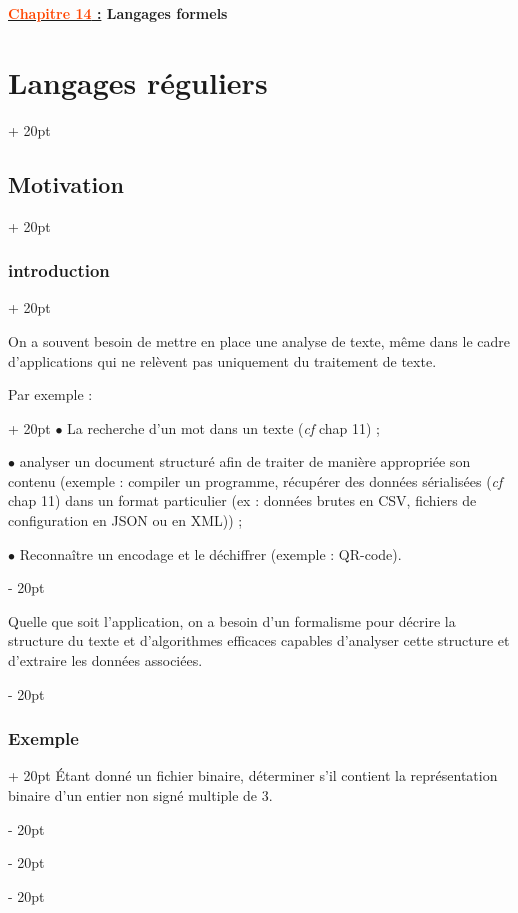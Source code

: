 \documentclass[a4paper, 12pt, twoside]{article}
\newcommand{\Emph}{\textcolor{ff4500}}
\newcommand{\ind}[1][20pt]{\advance\leftskip + #1}
\newcommand{\deind}[1][20pt]{\advance\leftskip - #1}
\newenvironment{indt}[2][20pt]{#2 \par \ind[#1]}{\par \deind} %
\newcommand{\thetitle}[2]{\begin{center}\textbf{{\LARGE \underline{\Emph{#1} :}} {\Large #2}}\end{center}}
\begin{document}
    
    \thetitle{Chapitre 14}{Langages formels}
    
    \tableofcontents
    \newpage
    
    \begin{indt}{\section{Langages réguliers}}
        \begin{indt}{\subsection{Motivation}}
            \begin{indt}{\subsubsection{introduction}}
                \label{1.1.1}

                On a souvent besoin de mettre en place une analyse de texte, même dans le cadre d'applications qui ne relèvent pas uniquement du traitement de texte.

                \begin{indt}{Par exemple :}
                    $\bullet$ La recherche d'un mot dans un texte (\textit{cf} chap 11) ;

                    $\bullet$ analyser un document structuré afin de traiter de manière appropriée son contenu (exemple : compiler un programme, récupérer des données sérialisées (\textit{cf} chap 11) dans un format particulier (ex : données brutes en CSV, fichiers de configuration en JSON ou en XML)) ;

                    $\bullet$ Reconnaître un encodage et le déchiffrer (exemple : QR-code).
                \end{indt}

                \vspace{12pt}
                
                Quelle que soit l'application, on a besoin d'un formalisme pour décrire la structure du texte et d'algorithmes efficaces capables d'analyser cette structure et d'extraire les données associées.
            \end{indt}

            \vspace{12pt}
            
            \begin{indt}{\subsubsection{Exemple}}
                \'Etant donné un fichier binaire, déterminer s'il contient la représentation binaire d'un entier non signé multiple de 3.


\end{indt}
\end{indt}
\end{indt}
\end{document}
